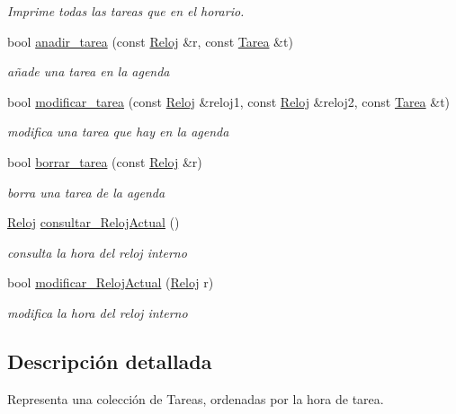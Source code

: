 \begin{DoxyCompactItemize}
\begin{DoxyCompactList}\small\item\em Imprime todas las tareas que en el horario. \end{DoxyCompactList}\item 
bool \hyperlink{class_agenda_aeba776d0394a5cc0da53e7955d713133}{anadir\-\_\-tarea} (const \hyperlink{class_reloj}{Reloj} \&r, const \hyperlink{class_tarea}{Tarea} \&t)
\begin{DoxyCompactList}\small\item\em añade una tarea en la agenda \end{DoxyCompactList}\item 
bool \hyperlink{class_agenda_aecbb7c1af5d9816012ba9b6b7c5f3bfe}{modificar\-\_\-tarea} (const \hyperlink{class_reloj}{Reloj} \&reloj1, const \hyperlink{class_reloj}{Reloj} \&reloj2, const \hyperlink{class_tarea}{Tarea} \&t)
\begin{DoxyCompactList}\small\item\em modifica una tarea que hay en la agenda \end{DoxyCompactList}\item 
bool \hyperlink{class_agenda_aee3c8541a89cc0a52ea39efda99e52c8}{borrar\-\_\-tarea} (const \hyperlink{class_reloj}{Reloj} \&r)
\begin{DoxyCompactList}\small\item\em borra una tarea de la agenda \end{DoxyCompactList}\item 
\hyperlink{class_reloj}{Reloj} \hyperlink{class_agenda_afc5f9ca9546ff0000e4abe92584ac526}{consultar\-\_\-\-Reloj\-Actual} ()
\begin{DoxyCompactList}\small\item\em consulta la hora del reloj interno \end{DoxyCompactList}\item 
bool \hyperlink{class_agenda_a3c6df651d375edc2f3c2f06103eefd8b}{modificar\-\_\-\-Reloj\-Actual} (\hyperlink{class_reloj}{Reloj} r)
\begin{DoxyCompactList}\small\item\em modifica la hora del reloj interno \end{DoxyCompactList}\end{DoxyCompactItemize}


\subsection{Descripción detallada}
Representa una colección de Tareas, ordenadas por la hora de tarea. 


